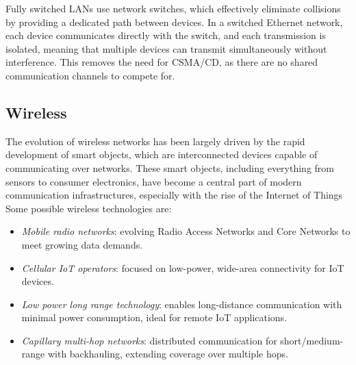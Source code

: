 Fully switched LANs use network switches, which effectively eliminate collisions by providing a dedicated path between devices. 
In a switched Ethernet network, each device communicates directly with the switch, and each transmission is isolated, meaning that multiple devices can transmit simultaneously without interference. 
This removes the need for CSMA/CD, as there are no shared communication channels to compete for.

\subsection{Wireless}
The evolution of wireless networks has been largely driven by the rapid development of smart objects, which are interconnected devices capable of communicating over networks. 
These smart objects, including everything from sensors to consumer electronics, have become a central part of modern communication infrastructures, especially with the rise of the Internet of Things
Some possible wireless technologies are: 
\begin{itemize}
    \item \textit{Mobile radio networks}: evolving Radio Access Networks and Core Networks to meet growing data demands.
    \item \textit{Cellular IoT operators}: focused on low-power, wide-area connectivity for IoT devices.
    \item \textit{Low power long range technology}: enables long-distance communication with minimal power consumption, ideal for remote IoT applications.
    \item \textit{Capillary multi-hop networks}: distributed communication for short/medium-range with backhauling, extending coverage over multiple hops.
\end{itemize}